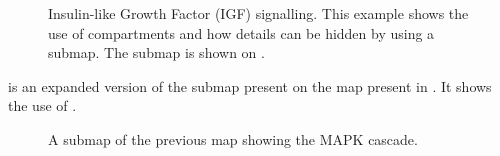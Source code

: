 \begin{figure}[t]
\begin{center}
\caption{Insulin-like Growth Factor (IGF) signalling. This example shows the use of compartments and how details can be hidden by using a submap. The submap is shown on .}\label{fig:insulin}
\end{center}
\end{figure}

 is an expanded version of the submap present on the map present in . It shows the use of .

\begin{figure}[b]
\begin{center}
\caption{A submap of the previous map showing the MAPK cascade.}\label{fig:mapk}
\end{center}
\end{figure}

